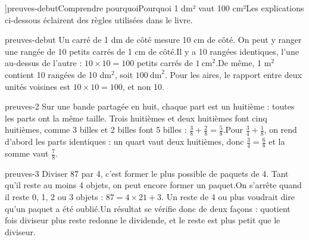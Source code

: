 \editionPage[\pdfbookmark[0]{Comprendre pourquoi}{bm-preuves-debut-parent}]{preuves-debut}{Comprendre pourquoi}{Pourquoi 1 dm² vaut 100 cm²}{Les explications ci-dessous éclairent des règles utilisées dans le livre.}
\begin{blocEdition}{preuves-debut}
Un carré de 1 dm de côté mesure 10 cm de côté. On peut y ranger une rangée de 10 petits carrés de 1 cm de côté.Il y a 10 rangées identiques, l’une au-dessus de l’autre : $10\times10=100$ petits carrés de $1\ \mathrm{cm}^2$.De même, 1 m$^2$ contient 10 rangées de 10 dm$^2$, soit $100\ \mathrm{dm}^2$. Pour les aires, le rapport entre deux unités voisines est $10\times10=100$, et non 10.
\end{blocEdition}
\begin{blocEdition}{preuves-2}
Sur une bande partagée en huit, chaque part est un huitième : toutes les parts ont la même taille.\label{fig-preuves-2-preuve-fractions}
Trois huitièmes et deux huitièmes font cinq huitièmes, comme 3 billes et 2 billes font 5 billes : $\frac38+\frac28=\frac58$.Pour $\frac34+\frac18$, on rend d’abord les parts identiques : un quart vaut deux huitièmes, donc $\frac34=\frac68$ et la somme vaut $\frac78$.
\end{blocEdition}
\begin{blocEdition}{preuves-3}
Diviser 87 par 4, c’est former le plus possible de paquets de 4. Tant qu’il reste au moins 4 objets, on peut encore former un paquet.On s’arrête quand il reste 0, 1, 2 ou 3 objets : $87=4\times21+3$. Un reste de 4 ou plus voudrait dire qu’un paquet a été oublié.Un résultat se vérifie donc de deux façons : quotient fois diviseur plus reste redonne le dividende, et le reste est plus petit que le diviseur.
\end{blocEdition}
